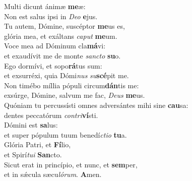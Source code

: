 \evenverse Multi dicunt ánimæ \textbf{me}æ:~\*\\
\evenverse Non est salus ipsi in \textit{De}\textit{o} \textbf{e}jus.\\
\oddverse Tu autem, Dómine, suscéptor \textbf{me}us es,~\*\\
\oddverse glória mea, et exáltans \textit{ca}\textit{put} \textbf{me}um.\\
\evenverse Voce mea ad Dóminum cla\textbf{má}vi:~\*\\
\evenverse et exaudívit me de monte \textit{san}\textit{cto} \textbf{su}o.\\
\oddverse Ego dormívi, et sopo\textbf{rá}tus sum:~\*\\
\oddverse et exsurréxi, quia Dómi\textit{nus} \textit{su}\textbf{scé}pit me.\\
\evenverse Non timébo míllia pópuli circum\textbf{dán}tis me:~\*\\
\evenverse exsúrge, Dómine, salvum me fac, \textit{De}\textit{us} \textbf{me}us.\\
\oddverse Quóniam tu percussísti omnes adversántes mihi sine \textbf{cau}sa:~\*\\
\oddverse dentes peccatórum \textit{con}\textit{tri}\textbf{ví}sti.\\
\evenverse Dómini est \textbf{sa}lus:~\*\\
\evenverse et super pópulum tuum benedí\textit{cti}\textit{o} \textbf{tu}a.\\
\oddverse Glória Patri, et \textbf{Fí}lio,~\*\\
\oddverse et Spirí\textit{tu}\textit{i} \textbf{San}cto.\\
\evenverse Sicut erat in princípio, et nunc, et \textbf{sem}per,~\*\\
\evenverse et in sǽcula sæcu\textit{ló}\textit{rum}. \textbf{A}men.\\
